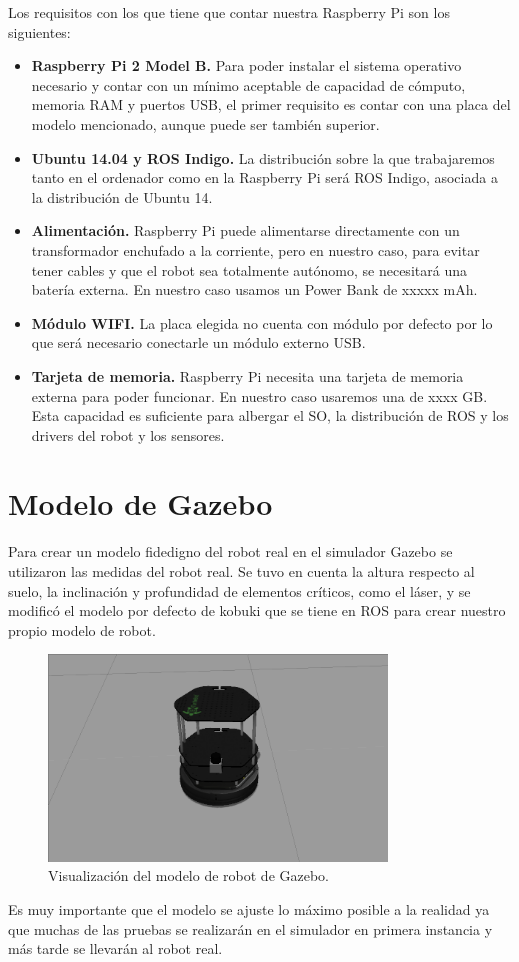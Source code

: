 Los requisitos con los que tiene que contar nuestra Raspberry Pi son los siguientes:
\begin{itemize}
\item \textbf{Raspberry Pi 2 Model B.} Para poder instalar el sistema operativo necesario y contar con un mínimo aceptable de capacidad de cómputo, memoria RAM y puertos USB, el primer requisito es contar con una placa del modelo mencionado, aunque puede ser también superior.
\item \textbf{Ubuntu 14.04 y ROS Indigo.} La distribución sobre la que trabajaremos tanto en el ordenador como en la Raspberry Pi será ROS Indigo, asociada a la distribución de Ubuntu 14.
\item \textbf{Alimentación.} Raspberry Pi puede alimentarse directamente con un transformador enchufado a la corriente, pero en nuestro caso, para evitar tener cables y que el robot sea totalmente autónomo, se necesitará una batería externa. En nuestro caso usamos un Power Bank de xxxxx mAh.
\item \textbf{Módulo WIFI.} La placa elegida no cuenta con módulo por defecto por lo que será necesario conectarle un módulo externo USB.
\item \textbf{Tarjeta de memoria.} Raspberry Pi necesita una tarjeta de memoria externa para poder funcionar. En nuestro caso usaremos una de xxxx GB. Esta capacidad es suficiente para albergar el SO, la distribución de ROS y los drivers del robot y los sensores.
\end{itemize}



\section{Modelo de Gazebo}
\label{cap:modelodegazebo}
Para crear un modelo fidedigno del robot real en el simulador Gazebo se utilizaron las medidas del robot real. Se tuvo en cuenta la altura respecto al suelo, la inclinación y profundidad de elementos críticos, como el láser, y se modificó el modelo por defecto de kobuki que se tiene en ROS para crear nuestro propio modelo de robot.

\begin{figure} [hbtp]
  \begin{center}
    \includegraphics[width=9cm]{img/cap4/modelogazebo}
  \end{center}
  \caption{Visualización del modelo de robot de Gazebo.}
  \label{fig:modelogazebo}
\end{figure}


Es muy importante que el modelo se ajuste lo máximo posible a la realidad ya que muchas de las pruebas se realizarán en el simulador en primera instancia y más tarde se llevarán al robot real.
